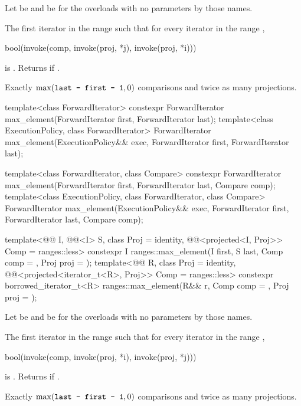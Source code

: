 \begin{itemdescr}
\pnum
Let  be 
and  be 
for the overloads with no parameters by those names.

\pnum
\returns
The first iterator  in the range 
such that for every iterator  in the range ,
\begin{codeblock}
bool(invoke(comp, invoke(proj, *j), invoke(proj, *i)))
\end{codeblock}
is .
Returns  if .

\pnum
\complexity
Exactly $\max(\texttt{last - first - 1}, 0)$ comparisons and
twice as many projections.
\end{itemdescr}

%
\begin{itemdecl}
template<class ForwardIterator>
  constexpr ForwardIterator max_element(ForwardIterator first, ForwardIterator last);
template<class ExecutionPolicy, class ForwardIterator>
  ForwardIterator max_element(ExecutionPolicy&& exec,
                              ForwardIterator first, ForwardIterator last);

template<class ForwardIterator, class Compare>
  constexpr ForwardIterator max_element(ForwardIterator first, ForwardIterator last,
                                        Compare comp);
template<class ExecutionPolicy, class ForwardIterator, class Compare>
  ForwardIterator max_element(ExecutionPolicy&& exec,
                              ForwardIterator first, ForwardIterator last,
                              Compare comp);

template<@@ I, @@<I> S, class Proj = identity,
         @@<projected<I, Proj>> Comp = ranges::less>
  constexpr I ranges::max_element(I first, S last, Comp comp = {}, Proj proj = {});
template<@@ R, class Proj = identity,
         @@<projected<iterator_t<R>, Proj>> Comp = ranges::less>
  constexpr borrowed_iterator_t<R>
    ranges::max_element(R&& r, Comp comp = {}, Proj proj = {});
\end{itemdecl}

\begin{itemdescr}
\pnum
Let  be 
and  be 
for the overloads with no parameters by those names.

\pnum
\returns
The first iterator  in the range 
such that for every iterator  in the range ,
\begin{codeblock}
bool(invoke(comp, invoke(proj, *i), invoke(proj, *j)))
\end{codeblock}
is .
Returns  if .

\pnum
\complexity
Exactly $\max(\texttt{last - first - 1}, 0)$ comparisons and
twice as many projections.
\end{itemdescr}

